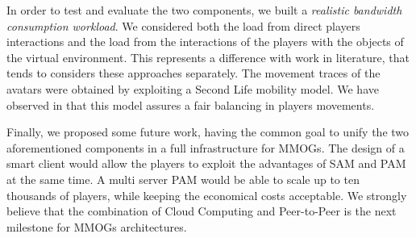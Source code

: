 \documentclass[final,10pt,a5paper]{phdimt}
\theoremstyle{definition}
\begin{document}
In order to test and evaluate the two components, we built a \textit{realistic bandwidth consumption workload}. 
We considered both the load from direct players interactions and the load from the interactions of the players with the objects of the virtual environment. 
This represents a difference with work in literature, that tends to considers these approaches separately.
The movement traces of the avatars were obtained by exploiting a Second Life mobility model.
We have observed in \cite{carlini2011evaluating} that this model assures a fair balancing in players movements.


Finally, we proposed some future work, having the common goal to unify the two aforementioned components in a full infrastructure for MMOGs.
The design of a smart client would allow the players to exploit the advantages of SAM and PAM at the same time. A multi server PAM would be able to scale up to ten thousands of players, while keeping the economical costs acceptable. 
We strongly believe that the combination of Cloud Computing and Peer-to-Peer is the next milestone for MMOGs architectures.

\clearpage{}


{\small
	\renewcommand{\bibname}{References} 
	
	
}

\makecopyright
\end{document}
